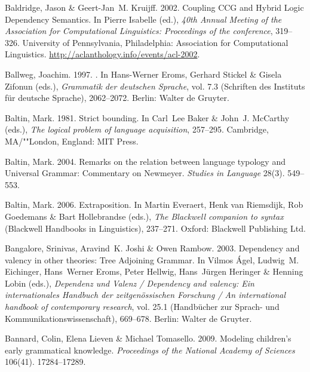 \begin{thebibliography}{1420}
Baldridge, Jason \& Geert-Jan~M. Kruijff. 2002.
\newblock Coupling {CCG} and {Hybrid Logic Dependency Semantics}.
\newblock In Pierre Isabelle (ed.), \emph{{40th Annual Meeting of the
  Association for Computational Linguistics}: {Proceedings} of the conference},
  319--326. University of Pennsylvania, Philadelphia: Association for
  Computational Linguistics.
\newblock \urlprefix\url{http://aclanthology.info/events/acl-2002}.

Ballweg, Joachim. 1997.
.
\newblock In Hans-Werner Eroms, Gerhard Stickel \& Gisela Zifonun (eds.),
  \emph{{Grammatik der deutschen Sprache}}, vol. 7.3  (Schriften des Instituts
  f{\"u}r deutsche Sprache), 2062--2072. Berlin: Walter de Gruyter.

Baltin, Mark. 1981.
\newblock Strict bounding.
\newblock In Carl~Lee Baker \& John~J. McCarthy (eds.), \emph{The logical
  problem of language acquisition}, 257--295. Cambridge, MA/""London, England:
  MIT Press.

Baltin, Mark. 2004.
\newblock Remarks on the relation between language typology and {Universal
  Grammar}: {Commentary} on {Newmeyer}.
\newblock \emph{Studies in Language} 28(3). 549--553.

Baltin, Mark. 2006.
\newblock Extraposition.
\newblock In Martin Everaert, Henk van Riemsdijk, Rob Goedemans \& Bart
  Hollebrandse (eds.), \emph{The {Blackwell} companion to syntax}  (Blackwell
  Handbooks in Linguistics), 237--271. Oxford: Blackwell Publishing Ltd.

Bangalore, Srinivas, Aravind~K. Joshi \& Owen Rambow. 2003.
\newblock Dependency and valency in other theories: {Tree Adjoining Grammar}.
\newblock In Vilmos {\'A}gel, Ludwig~M. Eichinger, Hans~Werner Eroms, Peter
  Hellwig, Hans~J{\"u}rgen Heringer \& Henning Lobin (eds.), \emph{{Dependenz
  und Valenz} / {Dependency} and valency: {Ein internationales Handbuch der
  zeitgen{\"o}ssischen Forschung} / {An} international handbook of contemporary
  research}, vol. 25.1  (Hand\-b{\"u}\-cher zur Sprach- und
  Kommunikationswissenschaft), 669--678. Berlin: Walter de Gruyter.

Bannard, Colin, Elena Lieven \& Michael Tomasello. 2009.
\newblock Modeling children's early grammatical knowledge.
\newblock \emph{Proceedings of the National Academy of Sciences} 106(41).
  17284--17289.


\end{thebibliography}
